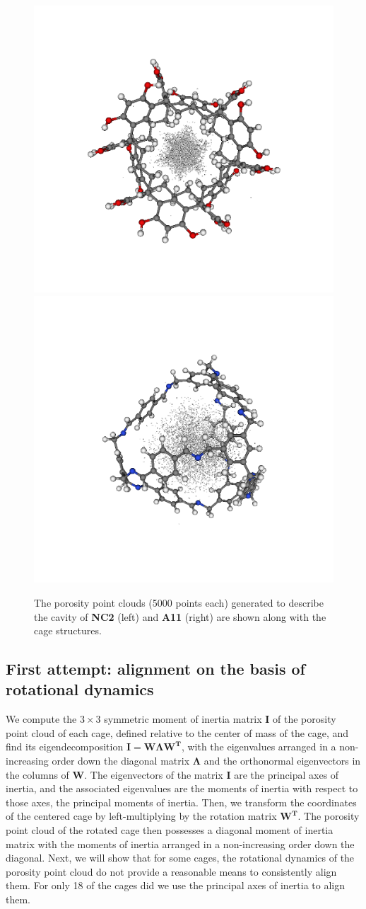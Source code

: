 \documentclass[journal=jacsat,manuscript=article]{achemso}
\begin{document}
{\begin{figure}
\centering
	\includegraphics[width=0.45\columnwidth]{NC2_porosity_point_cloud.png}
	\includegraphics[width=0.45\columnwidth]{A11_porosity_point_cloud.png}
	\caption{{\color{red} The porosity point clouds (5000 points each) generated to describe the cavity of \textbf{NC2} (left) and \textbf{A11} (right) are shown along with the cage structures.
	}%
	} \label{fig:porosity_pt_cloud}
\end{figure}

\subsection{First attempt: alignment on the basis of rotational dynamics}
\label{sec:alignment_details}
We compute the $3\times 3$ symmetric moment of inertia matrix $\mathbf{I}$ of the porosity point cloud of each cage, defined relative to the center of mass of the cage, and find its eigendecomposition $\mathbf{I}=\mathbf{W}\mathbf{\Lambda}\mathbf{W^T}$, with the eigenvalues arranged in a non-increasing order down the diagonal matrix $\mathbf{\Lambda}$ and the orthonormal eigenvectors in the columns of $\mathbf{W}$. The eigenvectors of the matrix $\mathbf{I}$ are the principal axes of inertia, and the associated eigenvalues are the moments of inertia with respect to those axes, the principal moments of inertia. Then, we transform the coordinates of the centered cage by left-multiplying by the rotation matrix $\mathbf{W^T}$. The porosity point cloud of the rotated cage then possesses a diagonal moment of inertia matrix with the moments of inertia arranged in a non-increasing order down the diagonal. Next, we will show that for some cages, the rotational dynamics of the porosity point cloud do not provide a reasonable means to consistently align them. For only 18 of the cages did we use the principal axes of inertia to align them.


}
\end{document}
